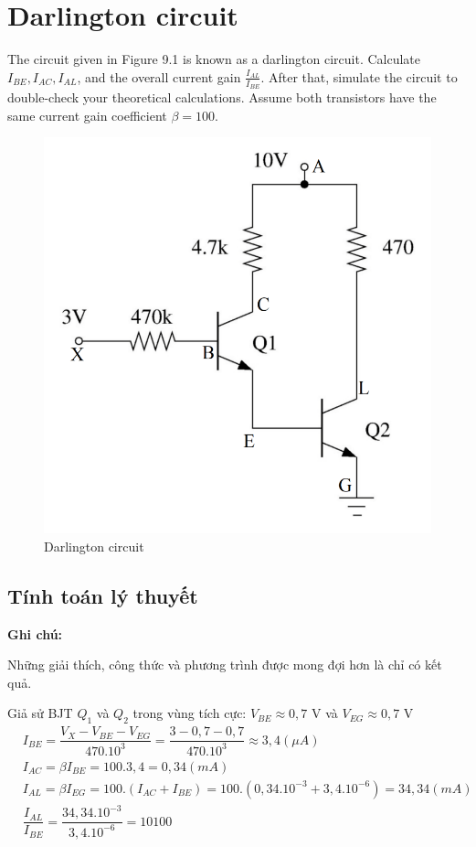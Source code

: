 \section{Darlington circuit}
The circuit given in Figure 9.1 is known as a darlington circuit. Calculate \(I_{BE} , I_{AC} , I_{AL}\),
and the overall current gain \(\frac{I_{AL}}{I_{BE}}\). After that, simulate the circuit to double-check your
theoretical calculations. Assume both transistors have the same current gain coefficient
\(\beta = 100.\)
\begin{figure}[ht]
    \centering
    \includegraphics[scale=0.4]{graphics/ex9/f1.png}
    \caption{Darlington circuit}
\end{figure}
\subsection{Tính toán lý thuyết}
\textbf{Ghi chú:}

Những giải thích, công thức và phương trình được mong đợi hơn là chỉ có kết quả.

Giả sử BJT \(Q_1\) và \(Q_2\) trong vùng tích cực: \(V_{BE} \approx 0,7 \) V và \(V_{EG} \approx 0,7\) V
    \begin{align*}
    &I_{BE}=\dfrac{V_X - V_{BE} - V_{EG}}{470.10^3} = \dfrac{3 - 0,7 - 0,7}{470.10^3} \approx 3,4 (\mu A) \\
    &I_{AC} = \beta I_{BE} = 100.3,4 = 0,34 (mA)\\
    &I_{AL} = \beta I_{EG} = 100.(I_{AC} + I_{BE}) = 100.(0,34.10^{-3} + 3,4.10^{-6}) = 34,34 (mA)\\
    &\dfrac{I_{AL}}{I_{BE}} = \dfrac{34,34.10^{-3}}{3,4.10^{-6}} = 10100\\
    \end{align*}
    \newpage
